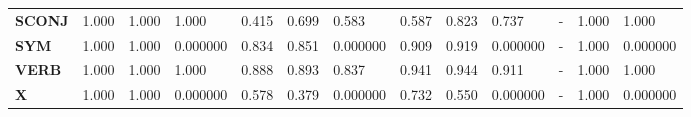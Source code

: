 \begin{table}
\begin{tabular}{|l||l||l||l||l||l||l||l||l||l||l||l||l|}
\textbf{SCONJ} & 1.000 & 1.000 & 1.000 & 0.415 & 0.699 & 0.583 & 0.587 & 0.823 & 0.737 & - & 1.000 & 1.000 \\
\textbf{SYM} & 1.000 & 1.000 & 0.000000 & 0.834 & 0.851 & 0.000000 & 0.909 & 0.919 & 0.000000 & - & 1.000 & 0.000000 \\
\textbf{VERB} & 1.000 & 1.000 & 1.000 & 0.888 & 0.893 & 0.837 & 0.941 & 0.944 & 0.911 & - & 1.000 & 1.000 \\
\textbf{X} & 1.000 & 1.000 & 0.000000 & 0.578 & 0.379 & 0.000000 & 0.732 & 0.550 & 0.000000 & - & 1.000 & 0.000000 \\
\bottomrule
\end{tabular}
\end{table}
